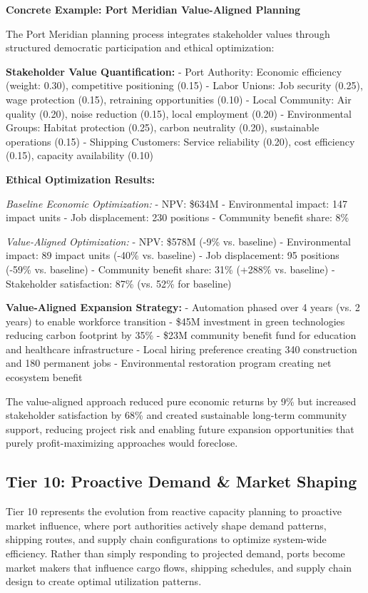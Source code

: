 \documentclass{article}
\begin{document}
\textbf{Concrete Example: Port Meridian Value-Aligned Planning}

The Port Meridian planning process integrates stakeholder values through structured democratic participation and ethical optimization:

\textbf{Stakeholder Value Quantification:}
- Port Authority: Economic efficiency (weight: 0.30), competitive positioning (0.15)
- Labor Unions: Job security (0.25), wage protection (0.15), retraining opportunities (0.10)  
- Local Community: Air quality (0.20), noise reduction (0.15), local employment (0.20)
- Environmental Groups: Habitat protection (0.25), carbon neutrality (0.20), sustainable operations (0.15)
- Shipping Customers: Service reliability (0.20), cost efficiency (0.15), capacity availability (0.10)

\textbf{Ethical Optimization Results:}

\textit{Baseline Economic Optimization:}
- NPV: \$634M
- Environmental impact: 147 impact units
- Job displacement: 230 positions
- Community benefit share: 8\%

\textit{Value-Aligned Optimization:}
- NPV: \$578M (-9\% vs. baseline)
- Environmental impact: 89 impact units (-40\% vs. baseline)
- Job displacement: 95 positions (-59\% vs. baseline)  
- Community benefit share: 31\% (+288\% vs. baseline)
- Stakeholder satisfaction: 87\% (vs. 52\% for baseline)

\textbf{Value-Aligned Expansion Strategy:}
- Automation phased over 4 years (vs. 2 years) to enable workforce transition
- \$45M investment in green technologies reducing carbon footprint by 35\%
- \$23M community benefit fund for education and healthcare infrastructure
- Local hiring preference creating 340 construction and 180 permanent jobs
- Environmental restoration program creating net ecosystem benefit

The value-aligned approach reduced pure economic returns by 9\% but increased stakeholder satisfaction by 68\% and created sustainable long-term community support, reducing project risk and enabling future expansion opportunities that purely profit-maximizing approaches would foreclose.

\subsection{Tier 10: Proactive Demand \& Market Shaping}

Tier 10 represents the evolution from reactive capacity planning to proactive market influence, where port authorities actively shape demand patterns, shipping routes, and supply chain configurations to optimize system-wide efficiency. Rather than simply responding to projected demand, ports become market makers that influence cargo flows, shipping schedules, and supply chain design to create optimal utilization patterns.
\end{document}
